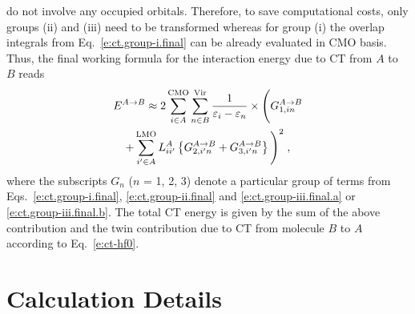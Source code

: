 do not involve any occupied orbitals.
Therefore, to save computational costs, only groups (ii) and (iii) need to be transformed
whereas for group (i) the overlap integrals from Eq.~\eqref{e:ct.group-i.final} 
can be already evaluated in CMO basis.
Thus, the final working formula for the interaction energy due to CT from $A$ to $B$ reads
%
\begin{multline} \label{e:ect-oep.final}
 E^{A\rightarrow B} \approx
 2 
 \sum_{i\in A}^{\rm CMO}
 \sum_{n\in B}^{\rm Vir}
 \frac{1}{\varepsilon_i - \varepsilon_n} \times 
 \Bigg(
   G_{1,in}^{A\rightarrow B} \\
  +
   \sum_{i'\in A}^{\rm LMO} L_{ii'}^A
   \left\{
   G_{2,i'n}^{A\rightarrow B}
  +G_{3,i'n}^{A\rightarrow B}
  \right\}
 \Bigg)^2 \;,
\end{multline}
%
where the subscripts $G_n$ ($n$ = 1, 2, 3) denote a particular group of 
terms from Eqs.~\eqref{e:ct.group-i.final}, \eqref{e:ct.group-ii.final} and \eqref{e:ct.group-iii.final.a}
or \eqref{e:ct.group-iii.final.b}. 
The total CT energy is given by the sum of the above contribution and the twin contribution
due to CT from molecule $B$ to $A$ according to Eq.~\eqref{e:ct-hf0}.

%
%




\section{\label{s:4.calculations}Calculation Details}

